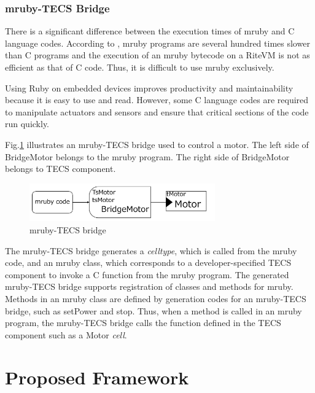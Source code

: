 \documentclass[JIP]{ipsj_v2/UTF8/ipsj}
\begin{document}

\subsubsection{mruby-TECS Bridge}
There is a significant difference between the execution times of mruby and C language codes.
According to  \cite{par:mrubyonTECS}, mruby programs are several hundred times slower than C programs and the execution of an mruby bytecode on a RiteVM is not as efficient as that of C code.
Thus, it is difficult to use mruby exclusively.

Using Ruby on embedded devices improves productivity and maintainability because it is easy to use and read.
However, some C language codes are required to manipulate actuators and sensors and ensure that critical sections of the code run quickly.

Fig.\ref{fig:mrubyTECSbridge} illustrates an mruby-TECS bridge used to control a motor.
The left side of BridgeMotor belongs to the mruby program.
The right side of BridgeMotor belongs to TECS component.

\begin{figure}[t]
    \centering
    \includegraphics[width=8cm,clip]{figure/mrubyTECSbridge.pdf}
\caption{mruby-TECS bridge}
\label{fig:mrubyTECSbridge}
\end{figure}

The mruby-TECS bridge generates a {\it celltype}, which is called from the mruby code, and an mruby class, which corresponds to a developer-specified TECS component to invoke a C function from the mruby program.
The generated mruby-TECS bridge supports registration of classes and methods for mruby.
Methods in an mruby class are defined by generation codes for an mruby-TECS bridge, such as setPower and stop.
Thus, when a method is called in an mruby program, the mruby-TECS bridge calls the function defined in the TECS component such as a Motor {\it cell}.

\section{Proposed Framework}
\label{sec:Proposed Framework}
\end{document}
